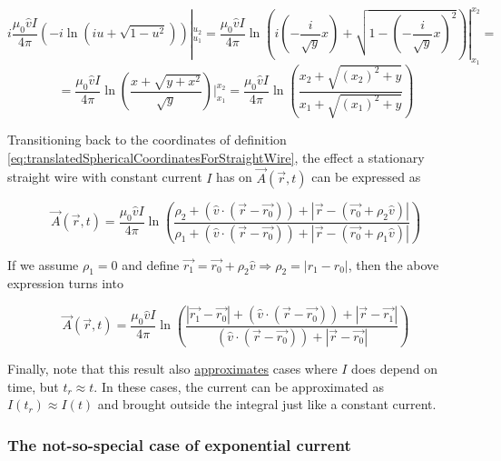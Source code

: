 ﻿\documentclass{article}
\begin{document}
\begin{equation*}
    i \frac{\mu_0 \hat{v} I}{4 \pi} (-i\ln(iu + \sqrt{1 - u^2})) |_{u_1}^{u_2} = \frac{\mu_0 \hat{v} I}{4 \pi} \ln \left( i(- \frac{i}{\sqrt{y}} x) + \sqrt{1 - (- \frac{i}{\sqrt{y}} x)^2} \right) |_{x_1}^{x_2} =
\end{equation*}
\begin{equation*}
    = \frac{\mu_0 \hat{v} I}{4 \pi} \ln \left( \frac{x + \sqrt{y + x^2}}{\sqrt{y}} \right) |_{x_1}^{x_2} = \frac{\mu_0 \hat{v} I}{4 \pi} \ln \left( \frac{x_2 + \sqrt{(x_2)^2 + y}}{x_1 + \sqrt{(x_1)^2 + y}} \right)
\end{equation*}

Transitioning back to the coordinates of definition \ref{eq:translatedSphericalCoordinatesForStraightWire}, the effect a stationary straight wire with constant current $I$ has on $\vec{A}(\vec{r}, t)$ can be expressed as

\begin{equation}
    \label{eq:effectOfStationaryStraightWireWithConstantCurrentOnA}
    \vec{A}(\vec{r}, t) = \frac{\mu_0 \hat{v} I}{4 \pi} \ln \left( \frac{\rho_2 + (\hat{v} \cdot (\vec{r} - \vec{r_0})) + |\vec{r} - (\vec{r_0} + \rho_2 \hat{v})|}{\rho_1 + (\hat{v} \cdot (\vec{r} - \vec{r_0})) + |\vec{r} - (\vec{r_0} + \rho_1 \hat{v})|} \right)
\end{equation}

If we assume $\rho_1 = 0$ and define $\vec{r_1} = \vec{r_0} + \rho_2 \hat{v} \Rightarrow \rho_2 = |r_1 - r_0|$, then the above expression turns into

\begin{equation*}
    \vec{A}(\vec{r}, t) = \frac{\mu_0 \hat{v} I}{4 \pi} \ln \left( \frac{|\vec{r_1} - \vec{r_0}| + (\hat{v} \cdot (\vec{r} - \vec{r_0})) + |\vec{r} - \vec{r_1}|}{(\hat{v} \cdot (\vec{r} - \vec{r_0})) + |\vec{r} - \vec{r_0}|} \right)
\end{equation*}

Finally, note that this result also \href{https://en.wikipedia.org/wiki/Approximation}{approximates} cases where $I$ does depend on time, but $t_r \approx t$. In these cases, the current can be approximated as $I(t_r) \approx I(t)$ and brought outside the integral just like a constant current.

\subsubsection{The not-so-special case of exponential current}
\end{document}
